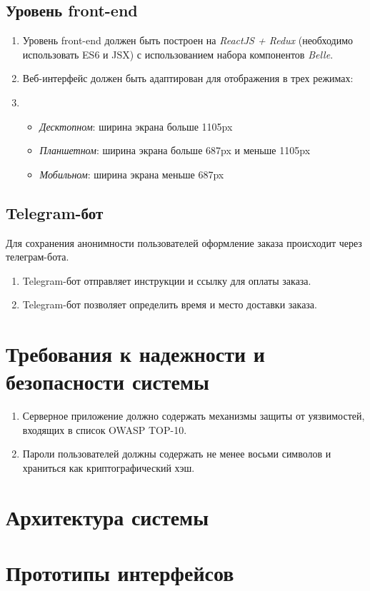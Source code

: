 \documentclass[12pt, a4paper]{article}
\begin{document}
\subsection{Уровень front-end}

\begin{enumerate}
\item Уровень front-end должен быть построен на \textit{ReactJS + Redux} 
  (необходимо использовать ES6 и JSX) с использованием набора
  компонентов \textit{Belle}.
\item Веб-интерфейс должен быть адаптирован для отображения в трех режимах:
\item 
  \begin{itemize}
  \item \textit{Десктопном}: ширина экрана больше 1105px
  \item \textit{Планшетном}: ширина экрана больше 687px и меньше 1105px
  \item \textit{Мобильном}: ширина экрана меньше 687px
  \end{itemize}
\end{enumerate}

\subsection{Telegram-бот}
\label{telegram-bot}

Для сохранения анонимности пользователей оформление заказа происходит
через телеграм-бота.

\begin{enumerate}
\item Telegram-бот отправляет инструкции и ссылку для оплаты заказа.
\item Telegram-бот позволяет определить время и место доставки заказа.
\end{enumerate}

\section{Требования к надежности и безопасности системы}

\begin{enumerate}
\item Серверное приложение должно содержать механизмы защиты от
  уязвимостей, входящих в список OWASP TOP-10.
\item Пароли пользователей должны содержать не менее восьми 
  символов и храниться как криптографический хэш.
\end{enumerate}

\section{Архитектура системы}

\section{Прототипы интерфейсов}

\end{document}
